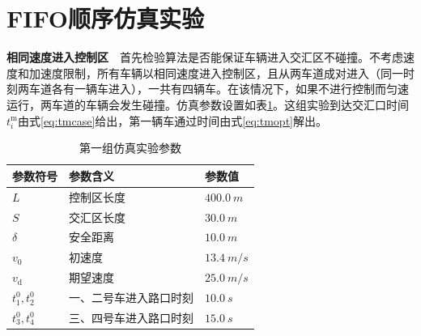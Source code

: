 \section{FIFO顺序仿真实验}
\textbf{相同速度进入控制区}\ \
首先检验算法是否能保证车辆进入交汇区不碰撞。不考虑速度和加速度限制，所有车辆以相同速度进入控制区，且从两车道成对进入（同一时刻两车道各有一辆车进入），一共有四辆车。在该情况下，如果不进行控制而匀速运行，两车道的车辆会发生碰撞。仿真参数设置如表\ref{tab:case1:param}。这组实验到达交汇口时间$t_i^\mathrm{m}$由式\eqref{eq:tmcase}给出，第一辆车通过时间由式\eqref{eq:tmopt}解出。
\begin{table}[htbp]
\centering
\caption{第一组仿真实验参数}
\label{tab:case1:param}
\begin{tabular}{lll}
\toprule[1.5pt]
参数符号 & 参数含义 & 参数值 \\
\midrule[1pt]
$L$ & 控制区长度 & $\SI{400.0}{m}$ \\
$S$ & 交汇区长度 & $\SI{30.0}{m}$ \\
$\delta$ & 安全距离 & $\SI{10.0}{m}$ \\
$v_0$ & 初速度 & $\SI{13.4}{m\per s}$ \\
$v_\mathrm{d}$ & 期望速度 & $\SI{25.0}{m\per s}$ \\
$t_1^0, t_2^0$ & 一、二号车进入路口时刻 & $\SI{10.0}{s}$ \\
$t_3^0, t_4^0$ & 三、四号车进入路口时刻 & $\SI{15.0}{s}$ \\
\bottomrule[1.5pt]
\end{tabular}
\end{table}

